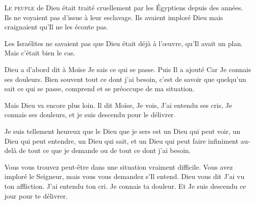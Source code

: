 



\lettrine{L}{e peuple} de Dieu était traité cruellement
 par les Égyptiens depuis des années.
 Ils ne voyaient pas d'issue à leur esclavage.
 Ils avaient imploré Dieu mais craignaient qu'Il ne les écoute pas.


Les Israélites ne savaient pas que Dieu était déjà à l'\oe{}uvre,
 qu'Il avait un plan. Mais c'était bien le cas.

Dieu a d'abord dit à Moïse\frcolon{} \Og Je sais ce qui se passe. \Fg{}
 Puis Il a ajouté\frcolon{} \Og Car Je connais ses douleurs. \Fg{}
 Bien souvent tout ce dont j'ai besoin,
 c'est de savoir que quelqu'un sait ce qui se passe,
 comprend et se préoccupe de ma situation.

Mais Dieu va encore plus loin. Il dit\frcolon{}
 \Og Moïse, Je vois, J'ai entendu ses cris, Je connais ses douleurs,
 et je suis descendu pour le délivrer. \Fg{}

Je suis tellement heureux que le Dieu que je sers est un Dieu qui peut voir,
 un Dieu qui peut entendre, un Dieu qui sait,
 et un Dieu qui peut faire infiniment au-delà
 de tout ce que je demande ou de tout ce dont j'ai besoin.

Vous vous trouvez peut-être dans une situation vraiment difficile.
 Vous avez imploré le Seigneur, mais vous vous demandez s'Il entend.
 Dieu vous dit\frcolon{}
 \Og J'ai vu ton affliction. J'ai entendu ton cri. Je connais ta douleur.
 Et Je suis descendu ce jour pour te délivrer. \Fg{}

\dvrule



